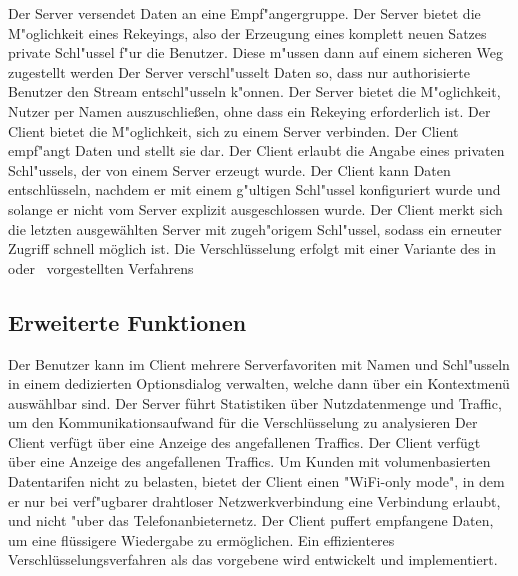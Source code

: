 \documentclass[a4paper,10pt]{scrartcl}
\begin{document}
\begin{usecase}
 {Der Server versendet Daten an eine Empf"angergruppe.}
 {Der Server bietet die M"oglichkeit eines Rekeyings, also
                 der Erzeugung eines komplett neuen Satzes private Schl"ussel
                 f"ur die Benutzer. Diese m"ussen dann auf einem sicheren
                 Weg zugestellt werden}
 {Der Server verschl"usselt Daten so, dass nur authorisierte
                 Benutzer den Stream entschl"usseln k"onnen.}
 {Der Server bietet die M"oglichkeit, Nutzer per Namen auszuschließen,
                 ohne dass ein Rekeying erforderlich ist.}
 {Der Client bietet die M"oglichkeit, sich zu einem Server verbinden.}
 {Der Client empf"angt Daten und stellt sie dar.}
 {Der Client erlaubt die Angabe eines privaten Schl"ussels, der von
                 einem Server erzeugt wurde.}
 {Der Client kann Daten entschlüsseln, nachdem er mit einem
                 g"ultigen Schl"ussel konfiguriert wurde und solange er nicht
                 vom Server explizit ausgeschlossen wurde.}
 {Der Client merkt sich die letzten ausgewählten Server mit
                  zugeh"origem Schl"ussel, sodass ein erneuter Zugriff schnell möglich
                  ist.}
 {Die Verschlüsselung erfolgt mit einer Variante des in~\cite[Section 2.2]{Naor00}
                  oder~\cite{Garg10} vorgestellten Verfahrens}
\end{usecase}

\subsection{Erweiterte Funktionen}

\begin{usecase}
 {Der Benutzer kann im Client mehrere Serverfavoriten
                  mit Namen und Schl"usseln in einem dedizierten Optionsdialog verwalten,
                  welche dann über ein Kontextmenü auswählbar sind.}
 {Der Server führt Statistiken über Nutzdatenmenge und Traffic,
                  um den Kommunikationsaufwand für die Verschlüsselung zu
                  analysieren}
 {Der Client verfügt über eine Anzeige des angefallenen Traffics.}
 {Der Client verfügt über eine Anzeige des angefallenen Traffics.}
 {Um Kunden mit volumenbasierten Datentarifen nicht zu belasten,
                  bietet der Client einen "WiFi-only mode", in dem er nur bei
                  verf"ugbarer drahtloser Netzwerkverbindung eine Verbindung erlaubt,
                  und nicht "uber das Telefonanbieternetz.}
 {Der Client puffert empfangene Daten, um eine flüssigere
                  Wiedergabe zu ermöglichen.}
 {Ein effizienteres Verschlüsselungsverfahren als das vorgebene
                  wird entwickelt und implementiert.}
\end{usecase}
\end{document}
